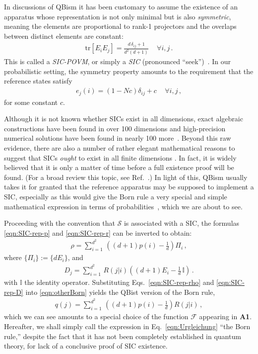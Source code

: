 \documentclass[%
 reprint,superscriptaddress,
 amsmath,amssymb,
 aps,pra, onecolumn, 12pt
]{revtex4-2}
\newcommand{\eqn}[1]{\begin{eqnarray} #1 \end{eqnarray}}
\newcommand{\tit}[1]{\textit{#1}}
\newcommand{\tr}[1]{  \textrm{tr}\left[ #1 \right]  }
\newcommand{\zum}[2]{\displaystyle\sum_{#1}^{#2}}
\begin{document}
In discussions of QBism it has been customary to assume the existence of an apparatus whose representation is not only minimal but is also \tit{symmetric}, meaning the elements are proportional to rank-1 projectors and the overlaps between distinct elements are constant:
\eqn{
\tr{E_i E_j} = \frac{d \, \delta_{ij} + 1}{d^2(d+1)} \, \quad  \forall i, j \, .
}
This is called a \tit{SIC-POVM}, or simply a \tit{SIC} (pronounced ``seek'')~\cite{ZAUNER_PHD,RENES04}. In our probabilistic setting, the symmetry property amounts to the requirement that the reference states satisfy
\eqn{ \label{eqn:prob_symmetry}
e_j(i) = (1-Nc) \delta_{ij} + c \, \quad  \forall i, j \, ,
}
for some constant $c$.

Although it is not known whether SICs exist in all dimensions, exact algebraic constructions have been found in over 100 dimensions and high-precision numerical solutions have been found in nearly 100 more~\cite{Grassl20}.  Beyond this raw evidence, there are also a number of rather elegant mathematical reasons to suggest that SICs \tit{ought} to exist in all finite dimensions \cite{Appleby11,Appleby15,Appleby17,Bengtsson20,DeBrota20d,Pandey20}.  In fact, it is widely believed that it is only a matter of time before a full existence proof will be found.  (For a broad review this topic, see Ref.\ \cite{SIC_REVIEW}.) In light of this, QBism usually takes it for granted that the reference apparatus may be supposed to implement a SIC, especially as this would give the Born rule a very special and simple mathematical expression in terms of probabilities~\cite{DeBrota20b,Fuchs2017}, which we are about to see.

Proceeding with the convention that $\mathcal{S}$ is associated with a SIC, the formulas \eqref{eqn:SIC-rep-p} and \eqref{eqn:SIC-rep-r} can be inverted to obtain:
\eqn{ \label{eqn:SIC-rep-rho}
\rho = \zum{i=1}{d^2}\, \left((d+1)p(i)-\frac{1}{d} \right) \Pi_i \, ,
}
where $\{ \Pi_i \} := \{ d E_i\}$, and
\eqn{ \label{eqn:SIC-rep-D}
D_j = \zum{i=1}{d^2}\, R(j|i)\left((d+1)E_i-\frac{1}{d}\, \mathbb{I} \right) \, .
}
with $\mathbb{I}$ the identity operator. Substituting Eqs.\ \eqref{eqn:SIC-rep-rho} and \eqref{eqn:SIC-rep-D} into \eqref{eqn:otherBorn} yields the QBist version of the Born rule,
\eqn{ \label{eqn:Urgleichung}
q(j) = \zum{i=1}{d^2}\, \left( (d+1)p(i)-\frac{1}{d} \right) R(j|i) \, ,
}
which we can see amounts to a special choice of the function $\mathcal{F}$ appearing in {\bf A1}. Hereafter, we shall simply call the expression in Eq.\ \eqref{eqn:Urgleichung} ``the Born rule,'' despite the fact that it has not been completely established in quantum theory, for lack of a conclusive proof of SIC existence.
\end{document}
